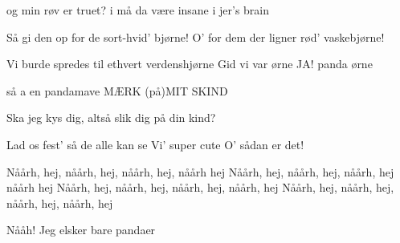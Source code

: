 \documentclass[a4paper,11pt]{article}
\begin{document}
\begin{song}
og min røv er truet?  
i må da være insane i jer’s brain


Så gi den op for de sort-hvid’ bjørne!
O’ for dem der ligner rød’ vaskebjørne!

Vi burde spredes til ethvert 
verdenshjørne
Gid vi var ørne
JA! panda ørne
 
så a en pandamave
MÆRK (på)MIT SKIND

Ska jeg kys dig, altså slik dig på din kind?

Lad os fest’ så de alle kan se
Vi’ super cute
O’ sådan er det!

Nåårh, hej, nåårh, hej, nåårh, hej, nåårh hej Nåårh, hej, nåårh, hej, nåårh, hej nåårh hej Nåårh, hej, nåårh, hej, nåårh, hej, nåårh, hej
Nåårh, hej, nåårh, hej, nåårh, hej, nåårh, hej

Nååh! Jeg elsker bare pandaer


\end{song}
\end{document}
